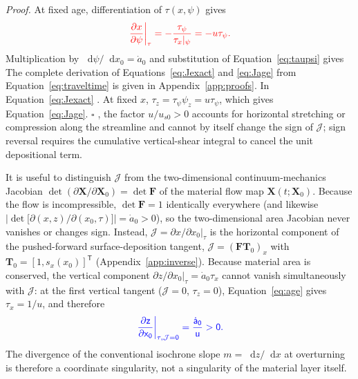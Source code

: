 \documentclass[review]{igs}
\providecommand{\DIFadd}[1]{{\protect\color{blue} \sf #1}} %
\providecommand{\DIFdel}[1]{{\protect\color{red} \scriptsize #1}} %
\providecommand{\DIFaddbegin}{} %
\providecommand{\DIFaddend}{} %
\providecommand{\DIFdelbegin}{} %
\providecommand{\DIFdelend}{} %
\newcommand{\DIFscaledelfig}{0.5}
\newlength{\DIFdelgraphicswidth} %
\newlength{\DIFdelgraphicsheight} %
\newcommand{\DIFaddincludegraphics}[2][]{{\color{blue}\fbox{\DIFOincludegraphics[#1]{#2}}}} %
\newcommand{\DIFdelincludegraphics}[2][]{%
\sbox{\DIFdelgraphicsbox}{\DIFOincludegraphics[#1]{#2}}%
\settoboxwidth{\DIFdelgraphicswidth}{\DIFdelgraphicsbox} %
\settoboxtotalheight{\DIFdelgraphicsheight}{\DIFdelgraphicsbox} %
\scalebox{\DIFscaledelfig}{%
\parbox[b]{\DIFdelgraphicswidth}{\usebox{\DIFdelgraphicsbox}\\[-\baselineskip] \rule{\DIFdelgraphicswidth}{0em}}\llap{\resizebox{\DIFdelgraphicswidth}{\DIFdelgraphicsheight}{%
\setlength{\unitlength}{\DIFdelgraphicswidth}%
\begin{picture}(1,1)%
\thicklines\linethickness{2pt} %
{\color[rgb]{1,0,0}\put(0,0){\framebox(1,1){}}}%
{\color[rgb]{1,0,0}\put(0,0){\line( 1,1){1}}}%
{\color[rgb]{1,0,0}\put(0,1){\line(1,-1){1}}}%
\end{picture}%
}\hspace*{3pt}}} %
} %
\DeclareRobustCommand{\DIFaddbegin}{\DIFOaddbegin \let\includegraphics\DIFaddincludegraphics} %
\DeclareRobustCommand{\DIFaddend}{\DIFOaddend \let\includegraphics\DIFOincludegraphics} %
\DeclareRobustCommand{\DIFdelbegin}{\DIFOdelbegin \let\includegraphics\DIFdelincludegraphics} %
\DeclareRobustCommand{\DIFdelend}{\DIFOaddend \let\includegraphics\DIFOincludegraphics} %
\begin{document}
\DIFdelbegin %
\DIFdel{\textit{Proof.}
At fixed age, differentiation of \(\tau(x,\psi)\) gives
}\begin{displaymath}
\DIFdel{\left.\frac{\partial x}{\partial\psi}\right|_{\tau}
=-\frac{\tau_{\psi}}{\tau_x|_{\psi}}
=-u\tau_{\psi}.
}\end{displaymath}%
\DIFdel{Multiplication by \(\mathop{}\!\mathrm{d}\psi/\mathop{}\!\mathrm{d} x_0=\dot a_0\) and substitution of Equation~\ref{eq:taupsi} gives }\DIFdelend \DIFaddbegin \DIFadd{The complete derivation of Equations~\ref{eq:Jexact} and \ref{eq:Jage} from Equation~\ref{eq:traveltime} is given in Appendix~\ref{app:proofs}. In }\DIFaddend Equation~\ref{eq:Jexact}\DIFdelbegin \DIFdel{. At fixed \(x\), \(\tau_z=\tau_{\psi}\psi_z=u\tau_{\psi}\), which gives Equation~\ref{eq:Jage}.
}%
\DIFdel{\(\square\)
}\DIFdelend \DIFaddbegin \DIFadd{, the factor \(u/u_{s0}>0\) accounts for horizontal stretching or compression along the streamline and cannot by itself change the sign of \(\mathcal{J}\); sign reversal requires the cumulative vertical-shear integral to cancel the unit depositional term.
}\DIFaddend 

\DIFaddbegin \DIFadd{It is useful to distinguish \(\mathcal{J}\) from the two-dimensional continuum-mechanics Jacobian \(\det(\partial\bm{X}/\partial\bm{X}_0)=\det\bm{F}\) of the material flow map \(\bm{X}(t;\bm{X}_0)\). Because the flow is incompressible, \(\det\bm{F}=1\) identically everywhere (and likewise \(\left|\det\bigl[\partial(x,z)/\partial(x_0,\tau)\bigr]\right|=\dot a_0>0\)), so the two-dimensional area Jacobian never vanishes or changes sign. Instead, \(\mathcal{J}=\left.\partial x/\partial x_0\right|_{\tau}\) is the horizontal component of the pushed-forward surface-deposition tangent, \(\mathcal{J}=(\bm{F}\bm{T}_0)_x\) with \(\bm{T}_0=[1,s_x(x_0)]^{\mathsf T}\) (Appendix~\ref{app:inverse}). Because material area is conserved, the vertical component \(\left.\partial z/\partial x_0\right|_{\tau}=\dot a_0\tau_x\) cannot vanish simultaneously with \(\mathcal{J}\): at the first vertical tangent (\(\mathcal{J}=0\), \(\tau_z=0\)), Equation~\ref{eq:age} gives \(\tau_x=1/u\), and therefore
}\begin{equation}
\DIFadd{\left.\frac{\partial z}{\partial x_0}\right|_{\tau,\mathcal{J}=0}
=\frac{\dot a_0}{u}>0.
\label{eq:verticalregular}
}\end{equation}
\DIFadd{The divergence of the conventional isochrone slope \(m=\mathop{}\!\mathrm{d} z/\mathop{}\!\mathrm{d} x\) at overturning is therefore a coordinate singularity, not a singularity of the material layer itself.
}
\end{document}
